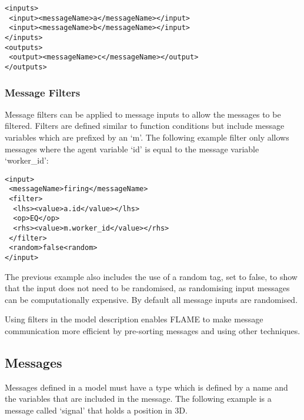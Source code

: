 \begin{mylisting}
\begin{verbatim}
<inputs>
 <input><messageName>a</messageName></input>
 <input><messageName>b</messageName></input>
</inputs>
<outputs>
 <output><messageName>c</messageName></output>
</outputs>
\end{verbatim}
\end{mylisting}

\subsubsection{Message Filters}\label{sect:msgfilter}
Message filters can be applied to message inputs to allow the messages to be
filtered. Filters are defined similar to function conditions but include
message variables which are prefixed by an `m'. The following example filter only
allows messages where the agent variable `id' is equal to the message variable
`worker\_id':

\begin{mylisting}
\begin{verbatim}
<input>
 <messageName>firing</messageName>
 <filter>
  <lhs><value>a.id</value></lhs>
  <op>EQ</op>
  <rhs><value>m.worker_id</value></rhs>
 </filter>
 <random>false<random>
</input>
\end{verbatim}
\end{mylisting}

The previous example also includes the use of a random tag, set to false, to show
that the input does not need to be randomised, as randomising input messages can be
computationally expensive. By default all message inputs are randomised.

Using filters in the model description enables FLAME to make message
communication more efficient by pre-sorting messages and using other techniques.


\subsection{Messages}

Messages defined in a model must have a type which is defined by a name and the
variables that are included in the message. The following example is a message
called `signal' that holds a position in 3D.

